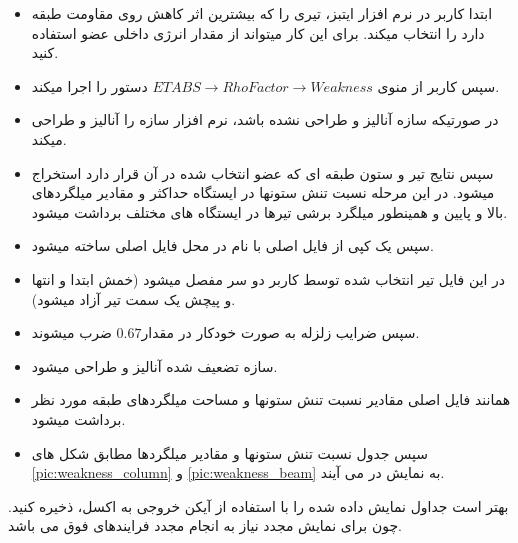 \begin{itemize}
    \item ابتدا کاربر در نرم افزار ایتبز، تیری را که بیشترین اثر کاهش روی مقاومت طبقه دارد را انتخاب میکند. برای این کار میتواند از مقدار انرژی داخلی عضو استفاده کنید.
    \item سپس کاربر از منوی $ETABS \rightarrow Rho Factor \rightarrow Weakness$ دستور را اجرا میکند.
    \item در صورتیکه سازه آنالیز و طراحی نشده باشد، نرم افزار سازه را آنالیز و طراحی میکند.
    \item سپس نتایج تیر و ستون طبقه ای که عضو انتخاب شده در آن قرار دارد استخراج میشود. در این مرحله نسبت تنش ستونها در ایستگاه حداکثر و مقادیر میلگردهای بالا و پایین و همینطور میلگرد برشی تیرها در ایستگاه های مختلف برداشت میشود.
    \item سپس یک کپی از فایل اصلی با نام  در محل فایل اصلی ساخته میشود.
    \item در این فایل تیر انتخاب شده توسط کاربر دو سر مفصل میشود (خمش ابتدا و انتها و پیچش یک سمت تیر آزاد میشود).
    \item سپس ضرایب زلزله به صورت خودکار در مقدار$0.67$ ضرب میشوند.
    \item سازه تضعیف شده آنالیز و طراحی میشود.
    \item همانند فایل اصلی مقادیر نسبت تنش ستونها و مساحت میلگردهای طبقه مورد نظر برداشت میشود.
    \item سپس جدول نسبت تنش ستونها و مقادیر میلگردها مطابق شکل های \ref{pic:weakness_column} و \ref{pic:weakness_beam} به نمایش در می آیند.
\end{itemize}

بهتر است جداول نمایش داده شده را با استفاده از آیکن خروجی به اکسل، ذخیره کنید. چون برای نمایش مجدد نیاز به انجام مجدد فرایندهای فوق می باشد.


